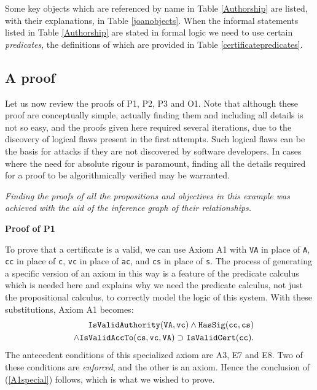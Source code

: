Some key objects which are referenced by name in Table \ref{Authorship} are
listed, with their explanations, in Table \ref{joanobjects}. When the informal
statements listed in Table \ref{Authorship} are stated in formal logic we need
to use certain {\em predicates}, the definitions of which are provided in Table \ref{certificatepredicates}.





\subsection{A proof}
Let us now review the proofs of P1, P2, P3 and O1.
Note that although these proof are conceptually simple, 
actually finding them and including all details is not
so easy, and the proofs given here required several iterations,
due to the discovery of logical flaws present in the first attempts.
Such logical flaws can be the basis for attacks if they are not 
discovered by software developers. 
In cases where the need for absolute rigour
is paramount, finding all the details required for a proof to be algorithmically
verified may be warranted.

{\em Finding the proofs of all the propositions and objectives in
this example was achieved with the aid of the inference graph of
their relationships.}

{\bf Proof of P1}


To prove that a certificate is a valid, we can use Axiom A1
with {\tt VA} in place of {\tt A}, {\tt cc} in place of {\tt c}, 
{\tt vc} in place of {\tt ac}, 
and {\tt cs} in place of {\tt s}.
The process of generating a specific version of an axiom in this way
is a feature of the predicate calculus which is needed here and explains
why we need the predicate calculus, not just the propositional calculus,
to correctly model the logic of this system. With these substitutions,
Axiom A1 becomes:
\begin{eqnarray}\label{A2specific}\label{A1special}
&&	\hbox{\tt IsValidAuthority}({\tt VA},{\tt vc}) \wedge \hbox{\tt HasSig}({\tt cc},{\tt cs}) \\ 
&&\wedge \hbox{\tt IsValidAccTo}({\tt cs}, {\tt vc}, {\tt VA} ) \nonumber
\supset \hbox{\tt IsValidCert}({\tt cc}).
\end{eqnarray}
The antecedent conditions of this specialized axiom are
A3, E7 and E8. Two of these conditions are {\em enforced}, and the other is
an axiom. Hence the conclusion of (\ref{A1special}) follows, which
is what we wished to prove.

